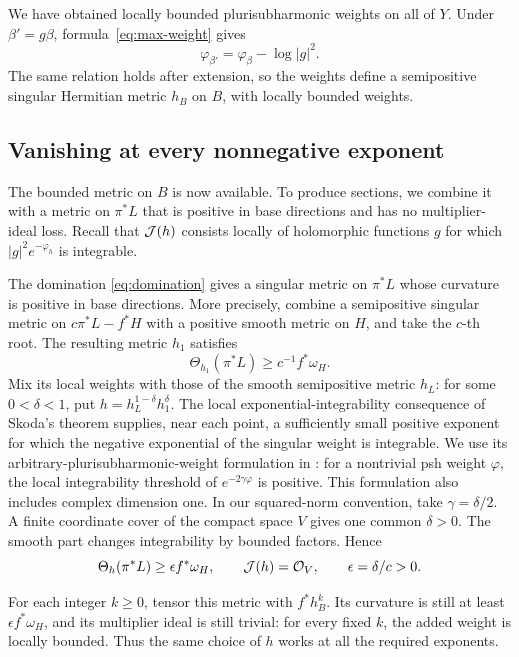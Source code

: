 We have obtained locally bounded plurisubharmonic weights on all of
\(Y\). Under \(\beta'=g\beta\), formula~\eqref{eq:max-weight}
gives
\[
\varphi_{\beta'}=\varphi_\beta-\log|g|^2.
\]
The same relation holds after extension, so the weights define a
semipositive singular Hermitian metric \(h_B\) on \(B\), with
locally bounded weights.

\subsection{Vanishing at every nonnegative exponent}

The bounded metric on \(B\) is now available. To produce sections,
we combine it with a metric on \(\pi^*L\) that is positive in base
directions and has no multiplier-ideal loss. Recall that \(\mathcal J(h)\)
consists locally of holomorphic functions \(g\) for which
\(|g|^2e^{-\varphi_h}\) is integrable.

The domination \eqref{eq:domination} gives a singular metric on
\(\pi^*L\) whose curvature is positive in base directions. More
precisely, combine a semipositive singular metric on
\(c\pi^*L-f^*H\) with a positive smooth metric on \(H\), and take
the \(c\)-th root. The resulting metric \(h_1\) satisfies
\[
\Theta_{h_1}(\pi^*L)\ge c^{-1}f^*\omega_H.
\]
Mix its local weights with those of the smooth semipositive metric
\(h_L\): for some \(0<\delta<1\), put
\(h=h_L^{1-\delta}h_1^\delta\). The local exponential-integrability consequence of Skoda's theorem
\cite[Proposition~7.1, p.~389]{Skoda1972} supplies, near each point,
a sufficiently small positive exponent for which the negative
exponential of the singular weight is integrable. We use its
arbitrary-plurisubharmonic-weight formulation in
\cite[Definition~0.1 and 1.4(8)]{DemaillyKollar2001}:
for a nontrivial psh weight \(\varphi\), the local integrability
threshold of \(e^{-2\gamma\varphi}\) is positive. This formulation
also includes complex dimension one. In our squared-norm convention,
take \(\gamma=\delta/2\). A finite coordinate
cover of the compact space \(V\) gives one common \(\delta>0\).
The smooth part changes integrability by bounded factors. Hence
\begin{equation}\label{eq:small-metric}
\Theta_h(\pi^*L)\ge\epsilon f^*\omega_H,
\qquad \mathcal J(h)=\mathcal O_V,
\qquad \epsilon=\delta/c>0.
\end{equation}

For each integer \(k\ge0\), tensor this metric with \(f^*h_B^k\).
Its curvature is still at least \(\epsilon f^*\omega_H\), and its
multiplier ideal is still trivial: for every fixed \(k\), the added
weight is locally bounded. Thus the same choice of \(h\) works at
all the required exponents.

